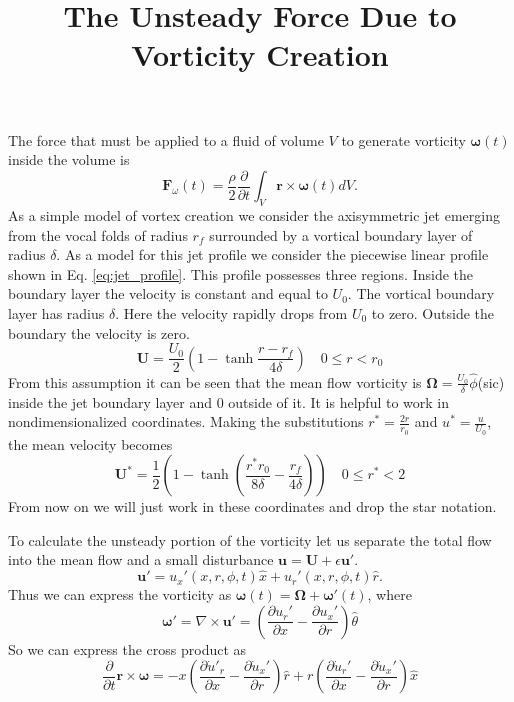 \documentclass[superscriptaddress, onecolumn, prl]{revtex4}
\begin{document}
\title{The Unsteady Force Due to Vorticity Creation}
\maketitle
The force that must be applied to a fluid of volume $V$ to generate vorticity $\boldsymbol{\omega}(t)$ inside the volume is 
\begin{equation}
\textbf{F}_{\omega}(t) = \frac{\rho}{2} \frac{\partial}{\partial t} \int_V \textbf{r} \times \boldsymbol{\omega}(t) dV.
\end{equation}
As a simple model of vortex creation we consider the axisymmetric jet emerging from the vocal folds of radius $r_f$ surrounded by a vortical boundary layer of radius $\delta$. As a model for this jet profile we consider the piecewise linear profile shown in Eq. \ref{eq:jet_profile}. This profile possesses three regions. Inside the boundary layer the velocity is constant and equal to $U_0$. The vortical boundary layer has radius $\delta$. Here the velocity rapidly drops from $U_0$ to zero. Outside the boundary the velocity is zero.
\begin{equation}
\label{eq:mean_flow1}
\textbf{U} = \frac{U_0}{2} \left( 1 - \tanh{\frac{r-r_f}{4 \delta}} \right) \quad 0 \leq r < r_0
\end{equation}
From this assumption it can be seen that the mean flow vorticity is $\boldsymbol{\Omega} = \frac{U_0}{\delta} \hat{\phi}$(sic) inside the jet boundary layer and $0$ outside of it. It is helpful to work in nondimensionalized coordinates. Making the substitutions $r^* = \frac{2r}{r_0}$ and $u^*=\frac{u}{U_0}$, the mean velocity becomes
\begin{equation}
\label{eq:mean_flow2}
\textbf{U}^* = \frac{1}{2} \left( 1 - \tanh\left(\frac{r^* r_0}{8\delta}-\frac{r_f}{4 \delta} \right) \right) \quad 0 \leq r^* < 2
\end{equation}
From now on we will just work in these coordinates and drop the star notation.

To calculate the unsteady portion of the vorticity let us separate the total flow into the mean flow and a small disturbance $\textbf{u} = \textbf{U} + \epsilon \textbf{u}'$.
\begin{equation}
\textbf{u}' = u_x'(x, r, \phi, t) \hat{x} + u_r'(x, r, \phi, t)  \hat{r}.
\end{equation}
Thus we can express the vorticity as $\boldsymbol{\omega}(t) = \boldsymbol{\Omega} + \boldsymbol{\omega}'(t)$, where 
\begin{equation}
\boldsymbol{\omega}' = \nabla \times \textbf{u}' = \left( \frac{\partial u_r'}{\partial x} - \frac{\partial u_x'}{\partial r}  \right) \hat{\theta}
\end{equation}
So we can express the cross product as
\begin{equation}
\frac{\partial}{\partial t}\textbf{r} \times \boldsymbol{\omega} = -x \left(\frac{\partial \dot{u}'_r}{\partial x} - \frac{\partial \dot{u}_x'}{\partial r}   \right) \hat{r} + r \left(\frac{\partial \dot{u}_r'}{\partial x} - \frac{\partial \dot{u}_x'}{\partial r}   \right) \hat{x}
\end{equation} 
\end{document}
